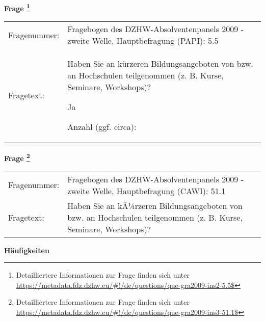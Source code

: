 				\vspace*{0.5cm}
                \noindent\textbf{Frage
	                \footnote{Detailliertere Informationen zur Frage finden sich unter
		              \url{https://metadata.fdz.dzhw.eu/\#!/de/questions/que-gra2009-ins2-5.5$}}}\\
				\begin{tabularx}{\hsize}{@{}lX}
					Fragenummer: &
					  Fragebogen des DZHW-Absolventenpanels 2009 - zweite Welle, Hauptbefragung (PAPI):
					  5.5
 \\
					Fragetext: & Haben Sie an kürzeren Bildungsangeboten von bzw. an Hochschulen teilgenommen (z. B. Kurse, Seminare, Workshops)?\par  Ja\par  Anzahl (ggf. circa): \\
				\end{tabularx}
				\vspace*{0.5cm}
                \noindent\textbf{Frage
	                \footnote{Detailliertere Informationen zur Frage finden sich unter
		              \url{https://metadata.fdz.dzhw.eu/\#!/de/questions/que-gra2009-ins3-51.1$}}}\\
				\begin{tabularx}{\hsize}{@{}lX}
					Fragenummer: &
					  Fragebogen des DZHW-Absolventenpanels 2009 - zweite Welle, Hauptbefragung (CAWI):
					  51.1
 \\
					Fragetext: & Haben Sie an kÃ¼rzeren Bildungsangeboten von bzw. an Hochschulen teilgenommen (z. B. Kurse, Seminare, Workshops)? \\
				\end{tabularx}





        		\vspace*{0.5cm}
                \noindent\textbf{Häufigkeiten}

